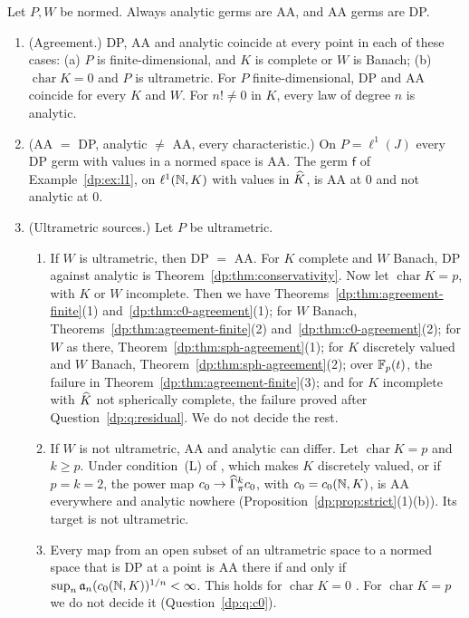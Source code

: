 \begin{theorem}\label{dp:thm:general-norms-agreement}
Let $P,W$ be normed. Always analytic germs are AA, and AA germs are DP.
\begin{enumerate}
\item \textup{(Agreement.)} DP, AA and analytic coincide at every point in each of these cases: \textup{(a)} $P$ is finite-dimensional, and $K$ is complete or $W$ is Banach; \textup{(b)} $\operatorname{char}K=0$ and $P$ is ultrametric. For $P$ finite-dimensional, DP and AA coincide for every $K$ and $W$. For $n!\ne0$ in $K$, every law of degree $n$ is analytic.
\item \textup{(AA $=$ DP, analytic $\ne$ AA, every characteristic.)} On $P=\ell^1(J)$ every DP germ with values in a normed space is AA. The germ $\mathsf f$ of Example~\ref{dp:ex:l1}, on $\ell^1(\mathbb N,K)$ with values in $\widehat K$, is AA at $0$ and not analytic at $0$.
\item \textup{(Ultrametric sources.)} Let $P$ be ultrametric.
\begin{enumerate}
\item If $W$ is ultrametric, then DP $=$ AA. For $K$ complete and $W$ Banach, DP against analytic is Theorem~\ref{dp:thm:conservativity}. Now let $\operatorname{char}K=p$, with $K$ or $W$ incomplete. Then we have Theorems~\ref{dp:thm:agreement-finite}(1) and~\ref{dp:thm:c0-agreement}(1); for $W$ Banach, Theorems~\ref{dp:thm:agreement-finite}(2) and~\ref{dp:thm:c0-agreement}(2); for $W$ as there, Theorem~\ref{dp:thm:sph-agreement}(1); for $K$ discretely valued and $W$ Banach, Theorem~\ref{dp:thm:sph-agreement}(2); over $\mathbb F_p(t)$, the failure in Theorem~\ref{dp:thm:agreement-finite}(3); and for $K$ incomplete with $\widehat K$ not spherically complete, the failure proved after Question~\ref{dp:q:residual}. We do not decide the rest.
\item If $W$ is not ultrametric, AA and analytic can differ. Let $\operatorname{char}K=p$ and $k\ge p$. Under condition~\textup{(L)} of \cite[Section~7.1]{I}, which makes $K$ discretely valued, or if $p=k=2$, the power map $c_0\to\widehat\Gamma^k_\pi c_0$, with $c_0=c_0(\mathbb N,K)$, is AA everywhere and analytic nowhere (Proposition~\ref{dp:prop:strict}(1)(b)). Its target is not ultrametric.
\item Every map from an open subset of an ultrametric space to a normed space that is DP at a point is AA there if and only if $\sup_n\mathfrak a_n(c_0(\mathbb N,K))^{1/n}<\infty$. This holds for $\operatorname{char}K=0$ \cite[Theorem~14.39(3)]{I}. For $\operatorname{char}K=p$ we do not decide it (Question~\ref{dp:q:c0}).

\end{enumerate}
\end{enumerate}
\end{theorem}
